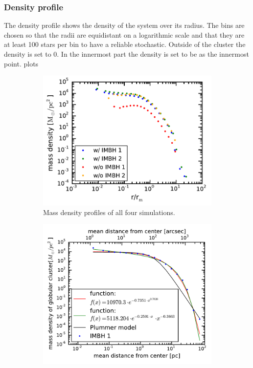 \subsubsection{Density profile}
The density profile shows the density of the system over its radius. The bins are chosen so that the radii are equidistant on a logarithmic scale and that they are at least 100 stars per bin to have a reliable stochastic. Outside of the cluster the density is set to 0. In the innermost part the density is set to be as the innermost point.
plots\\
\begin{figure}[htbp]
	\centering
	\begin{subfigure}{0.475\textwidth}
		\centering
		\includegraphics[width=\textwidth]{Plots/density_profiles.pdf}
		\caption{Mass density profiles of all four simulations.}
		\label{mass_dens_points}
	\end{subfigure}
	\hfill
	\begin{subfigure}{0.475\textwidth}
		\centering
		\includegraphics[width=\textwidth]{Plots/density_prof_analytic.pdf}

\end{subfigure}
\end{figure}
